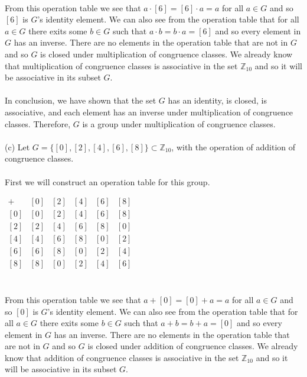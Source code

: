 \documentclass[11pt,a4paper]{article}
\begin{document}
~\\
From this operation table we see that $a\cdot [6] = [6]\cdot a = a$ for all $a\in G$ and so $[6]$ is $G$'s identity element. We can also see from the operation table that for all $a \in G$ there exits some $b\in G$ such that $a\cdot b = b\cdot a = [6]$ and so every element in $G$ has an inverse. There are no elements in the operation table that are not in $G$ and so $G$ is closed under multiplication of congruence classes. We already know that multiplication of congruence classes is associative in the set $\mathbb{Z}_{10}$ and so it will be associative in its subset $G$.\\
~\\
In conclusion, we have shown that the set $G$ has an identity, is closed, is associative, and each element has an inverse under multiplication of congruence classes. Therefore, $G$ is a group under multiplication of congruence classes.\\
~\\
(c) Let $G = \{[0], [2], [4], [6], [8]\} \subset \mathbb{Z}_{10}$, with the operation of addition of
congruence classes.\\
~\\
First we will construct an operation table for this group.
\begin{center}
$
\begin{array}{c|c|c|c|c|c}
+ & [0] & [2] & [4] & [6] & [8] \\\hline
[0] & [0] & [2] & [4] & [6] & [8] \\\hline
[2] & [2] & [4] & [6] & [8] & [0] \\\hline
[4] & [4] & [6] & [8] & [0] & [2] \\\hline
[6] & [6] & [8] & [0] & [2] & [4] \\\hline
[8] & [8] & [0] & [2] & [4] & [6] \\
\end{array}
$
\end{center}
~\\
From this operation table we see that $a + [0] = [0] + a = a$ for all $a\in G$ and so $[0]$ is $G$'s identity element. We can also see from the operation table that for all $a \in G$ there exits some $b\in G$ such that $a + b = b + a = [0]$ and so every element in $G$ has an inverse. There are no elements in the operation table that are not in $G$ and so $G$ is closed under addition of congruence classes. We already know that addition of congruence classes is associative in the set $\mathbb{Z}_{10}$ and so it will be associative in its subset $G$.\\
\end{document}
